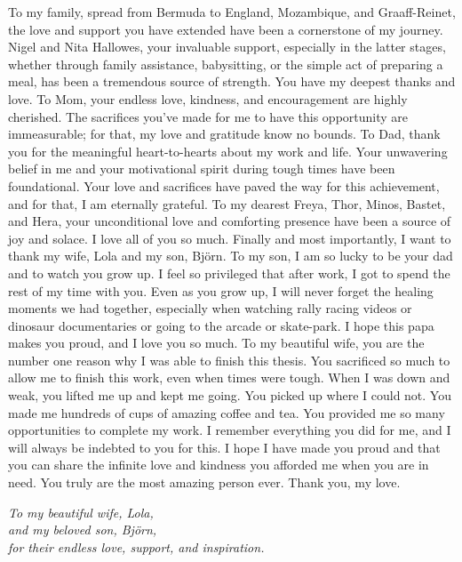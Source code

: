\documentclass[
11pt, %
english, %
onehalfspacing, %
headsepline, %
]{RhodesThesis} %
\theoremstyle{customdefstyle}
\begin{document}
\begin{acknowledgements}
  To my family, spread from Bermuda to England, Mozambique, and Graaff-Reinet, the love and support you have extended have been a cornerstone of my journey. Nigel and Nita Hallowes, your invaluable support, especially in the latter stages, whether through family assistance, babysitting, or the simple act of preparing a meal, has been a tremendous source of strength. You have my deepest thanks and love. To Mom, your endless love, kindness, and encouragement are highly cherished. The sacrifices you've made for me to have this opportunity are immeasurable; for that, my love and gratitude know no bounds. To Dad, thank you for the meaningful heart-to-hearts about my work and life. Your unwavering belief in me and your motivational spirit during tough times have been foundational. Your love and sacrifices have paved the way for this achievement, and for that, I am eternally grateful. To my dearest Freya, Thor, Minos, Bastet, and Hera, your unconditional love and comforting presence have been a source of joy and solace. I love all of you so much. Finally and most importantly, I want to thank my wife, Lola and my son, Björn. To my son, I am so lucky to be your dad and to watch you grow up. I feel so privileged that after work, I got to spend the rest of my time with you. Even as you grow up, I will never forget the healing moments we had together, especially when watching rally racing videos or dinosaur documentaries or going to the arcade or skate-park. I hope this papa makes you proud, and I love you so much. To my beautiful wife, you are the number one reason why I was able to finish this thesis. You sacrificed so much to allow me to finish this work, even when times were tough. When I was down and weak, you lifted me up and kept me going. You picked up where I could not. You made me hundreds of cups of amazing coffee and tea. You provided me so many opportunities to complete my work. I remember everything you did for me, and I will always be indebted to you for this. I hope I have made you proud and that you can share the infinite love and kindness you afforded me when you are in need. You truly are the most amazing person ever. Thank you, my love.
\end{acknowledgements}

\cleardoublepage
\begin{center}
  \noindent\textit{\Large To my beautiful wife, \emph{Lola},}\\[1cm]
  \textit{\Large and my beloved son, \emph{Björn},}\\[1cm]
  \textit{\Large for their endless love, support, and inspiration.}
\end{center}
\vfill
\end{document}
